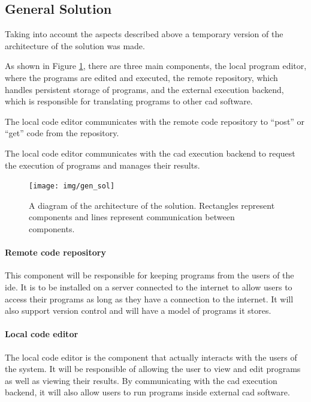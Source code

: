 \documentclass{./llncs2e/llncs}
\begin{document}

\subsection{General Solution}
	Taking into account the aspects described above a temporary version of the architecture of the solution was made.
	
	As shown in Figure \ref{fig:gen:sol}, there are three main components, the local program editor, where the programs are edited and executed, the remote repository, which handles persistent storage of programs, and the external execution backend, which is responsible for translating programs to other \ac{cad} software.
	
	The local code editor communicates with the remote code repository to ``post'' or ``get'' code from the repository.
	
	The local code editor communicates with the \ac{cad} execution backend to request the execution of programs and manages their results.
	
	\begin{figure}
		\centering
		\texttt{[image: img/gen\_sol]}
		\caption{A diagram of the architecture of the solution. Rectangles represent components and lines represent communication between components.}
		\label{fig:gen:sol}
	\end{figure}	
	
	\paragraph{Remote code repository}
		This component will be responsible for keeping programs from the users of the \ac{ide}.
		It is to be installed on a server connected to the internet to allow users to access their programs as long as they have a connection to the internet.
		It will also support version control and will have a model of programs it stores.
		
	\paragraph{Local code editor}
		The local code editor is the component that actually interacts with the users of the system.
		It will be responsible of allowing the user to view and edit programs as well as viewing their results.
		By communicating with the \ac{cad} execution backend, it will also allow users to run programs inside external \ac{cad} software.
		
\end{document}

